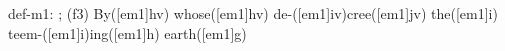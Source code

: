 def-m1: \grealign;
(f3) By([em1]hv) whose([em1]hv) de-([em1]iv)cree([em1]jv) the([em1]i) teem-([em1]i)ing([em1]h) earth([em1]g)